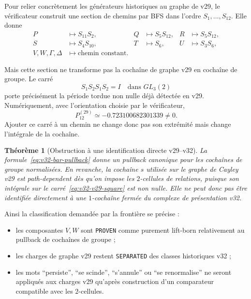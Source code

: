 \documentclass[11pt,a4paper]{article}
\newtheorem{theorem}{Théorème}[section]
\newcommand{\certProven}{\texttt{PROVEN}}
\newcommand{\certSeparated}{\texttt{SEPARATED}}
\begin{document}
Pour relier concrètement les générateurs historiques au graphe de v29, le vérificateur construit une
section de chemins par BFS dans l'ordre $S_1,\ldots,S_{12}$. Elle donne
\begin{equation}\label{eq:v32-BFS-paths}
\begin{aligned}
 P&\mapsto S_{11}S_2,&
 Q&\mapsto S_5S_{12},&
 R&\mapsto S_5S_{12},\\
 S&\mapsto S_4S_{10},&
 T&\mapsto S_6,&
 U&\mapsto S_3S_6,\\
 V,W,\Gamma,\Delta&\mapsto \text{chemin constant}.
\end{aligned}
\end{equation}

Mais cette section ne transforme pas la cochaîne de graphe v29 en cochaîne de groupe. Le carré
\begin{equation}\label{eq:v32-v29-square}
 S_1S_2S_1S_2=I\quad\text{dans }GL_3(2)
\end{equation}
porte précisément la période tordue non nulle déjà détectée en v29. Numériquement, avec
l'orientation choisie par le vérificateur,
\[
 \boxed{P_{12}^{(29)}\simeq-0.723100682301339\neq0.}
\]
Ajouter ce carré à un chemin ne change donc pas son extrémité mais change l'intégrale de la
cochaîne.

\begin{theorem}[Obstruction à une identification directe v29--v32]\label{thm:v32-v29-comparison-obstruction}
La formule~\eqref{eq:v32-bar-pullback} donne un pullback canonique pour les cochaînes de groupe
normalisées. En revanche, la cochaîne $s$ utilisée sur le graphe de Cayley v29 est
\emph{path-dependent} dès qu'on impose les $2$-cellules de relations, puisque son intégrale sur le
carré~\eqref{eq:v32-v29-square} est non nulle. Elle ne peut donc pas être identifiée directement à
une $1$-cochaîne fermée du complexe de présentation v32.
\end{theorem}

Ainsi la classification demandée par la frontière se précise :
\begin{itemize}
\item les composantes $V,W$ sont \certProven{} comme purement lift-born relativement au pullback
de cochaînes de groupe ;
\item les charges de graphe v29 restent \certSeparated{} des classes historiques v32 ;
\item les mots ``persiste'', ``se scinde'', ``s'annule'' ou ``se renormalise'' ne seront appliqués aux
charges v29 qu'après construction d'un comparateur compatible avec les $2$-cellules.
\end{itemize}
\end{document}
